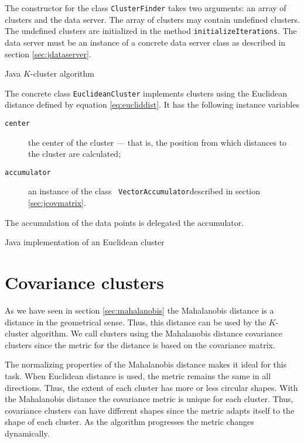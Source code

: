 \documentclass[twoside]{book}
\begin{document}
The constructor for the class {\tt ClusterFinder} takes two
arguments: an array of clusters and the data server. The array of
clusters may contain undefined clusters. The undefined clusters
are initialized in the method {\tt initializeIterations}. The data
server must be an instance of a concrete data server class as
described in section \ref{sec:jdataserver}.

\begin{listing} Java $K$-cluster algorithm \label{lj:clusterfinder}


\end{listing}

The concrete class {\tt EuclideanCluster} implements clusters
using the Euclidean distance defined by equation
\ref{eq:eucliddist}. It has the following instance variables
\begin{description}
  \item[\tt center] the center of the cluster --- that is, the
  position from which distances to the cluster are calculated;
  \item[\tt accumulator] an instance of the class {\tt
  VectorAccumulator}described in section \ref{sec:jcovmatrix}.
\end{description}
The accumulation of the data points is delegated the accumulator.

\begin{listing} Java implementation of an Euclidean cluster \label{lj:euclidcluster}

\end{listing}

\section{Covariance clusters}
\label{sec:mahalanobiscluster} As we have seen in section
\ref{sec:mahalanobis} the Mahalanobis distance is a distance in
the geometrical sense. Thus, this distance can be used by the
$K$-cluster algorithm. We call clusters using the Mahalanobis
distance covariance clusters since the metric for the distance is
based on the covariance matrix.

The normalizing properties of the Mahalanobis distance makes it
ideal for this task. When Euclidean distance is used, the metric
remains the same in all directions. Thus, the extent of each
cluster has more or less circular shapes. With the Mahalanobis
distance the covariance metric is unique for each cluster. Thus,
covariance clusters can have different shapes since the metric
adapts itself to the shape of each cluster. As the algorithm
progresses the metric changes dynamically.
\end{document}
